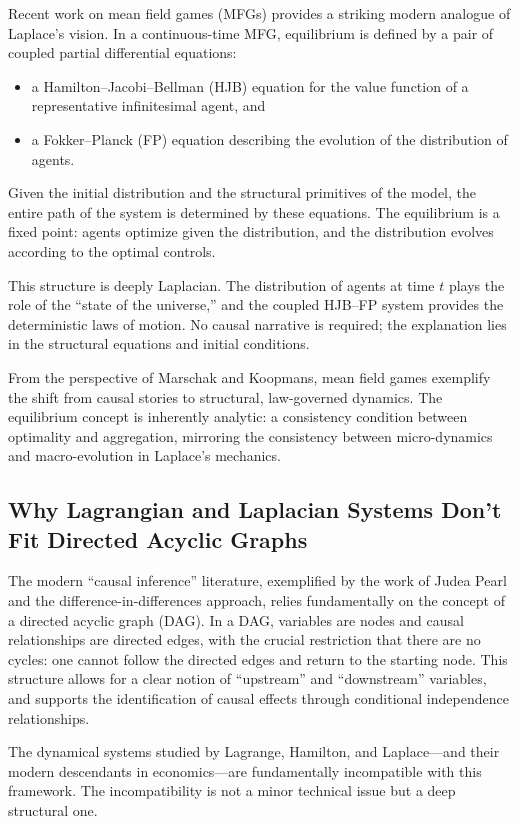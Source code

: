 \documentclass[12pt]{article}
\begin{document}
Recent work on mean field games (MFGs) provides a striking modern analogue of Laplace's vision. In a continuous-time MFG, equilibrium is defined by a pair of coupled partial differential equations:
\begin{itemize}
\item a Hamilton--Jacobi--Bellman (HJB) equation for the value function of a representative infinitesimal agent, and
\item a Fokker--Planck (FP) equation describing the evolution of the distribution of agents.
\end{itemize}

Given the initial distribution and the structural primitives of the model, the entire path of the system is determined by these equations. The equilibrium is a fixed point: agents optimize given the distribution, and the distribution evolves according to the optimal controls.

This structure is deeply Laplacian. The distribution of agents at time $t$ plays the role of the ``state of the universe,'' and the coupled HJB--FP system provides the deterministic laws of motion. No causal narrative is required; the explanation lies in the structural equations and initial conditions.

From the perspective of Marschak and Koopmans, mean field games exemplify the shift from causal stories to structural, law-governed dynamics. The equilibrium concept is inherently analytic: a consistency condition between optimality and aggregation, mirroring the consistency between micro-dynamics and macro-evolution in Laplace's mechanics.


\subsection{Why Lagrangian and Laplacian Systems Don't Fit Directed Acyclic Graphs}

The modern ``causal inference'' literature, exemplified by the work of Judea Pearl and the difference-in-differences approach, relies fundamentally on the concept of a directed acyclic graph (DAG). In a DAG, variables are nodes and causal relationships are directed edges, with the crucial restriction that there are no cycles: one cannot follow the directed edges and return to the starting node. This structure allows for a clear notion of ``upstream'' and ``downstream'' variables, and supports the identification of causal effects through conditional independence relationships.

The dynamical systems studied by Lagrange, Hamilton, and Laplace---and their modern descendants in economics---are fundamentally incompatible with this framework. The incompatibility is not a minor technical issue but a deep structural one.
\end{document}
